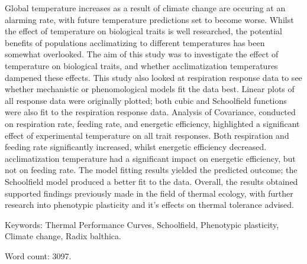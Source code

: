 \documentclass[../../Paper.tex]{subfiles}
\begin{document}
Global temperature increases as a result of climate change are occuring 
at an alarming rate, with future temperature predictions set
to become worse. Whilst the effect of temperature on biological
traits is well researched, the potential benefits of populations acclimatizing to different temperatures 
has been somewhat overlooked. The aim of this study was
to investigate the effect of temperature on biological traits,
and whether acclimatization temperatures dampened these effects.
This study also looked at respiration response data to see whether mechanistic or
phenomological models fit the data best. Linear plots of all 
response data were originally plotted; both cubic and Schoolfield
functions were also fit to the respiration response
data. Analysis of Covariance, conducted on respiration rate, feeding rate, and
energetic efficiency, highlighted a significant effect of experimental temperature
on all trait responses. Both respiration and feeding rate significantly increased, whilst energetic efficiency
decreased. acclimatization temperature had a significant impact on energetic efficiency, 
but not on feeding rate. The model fitting results yielded the predicted outcome; 
the Schoolfield model produced a better fit to the data. Overall, the results
obtained supported findings previously made in the field of thermal
ecology, with further research into phenotypic plasticity and it's effects on thermal
tolerance advised.
\vspace{1cm}

Keywords: Thermal Performance Curves, Schoolfield, Phenotypic plasticity, Climate change, Radix balthica. 


\vspace{3cm}
Word count: 3097. 
\newpage
\end{document}
